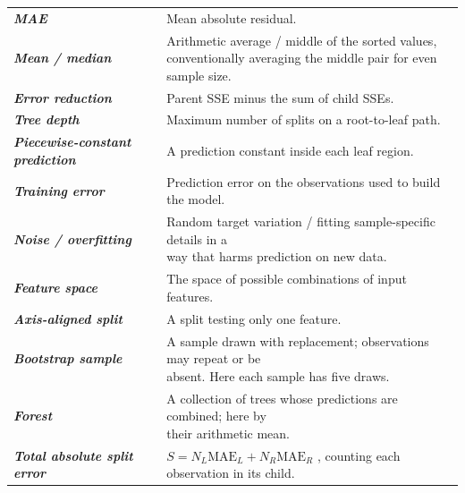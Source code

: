 \documentclass{course_sheet}
\begin{document}
\begin{longtable}{l|l}
\textbf{\textit{MAE}} & Mean absolute residual. \\[1.5pt]
\textbf{\textit{Mean / median}} & \shortstack[l]{Arithmetic average / middle of the sorted values, \\ conventionally averaging the middle pair for even sample size.} \\[1.5pt]
\textbf{\textit{Error reduction}} & Parent SSE minus the sum of child SSEs. \\[1.5pt]
\textbf{\textit{Tree depth}} & Maximum number of splits on a root-to-leaf path. \\[1.5pt]
\textbf{\textit{Piecewise-constant prediction}} & A prediction constant inside each leaf region. \\[1.5pt]
\textbf{\textit{Training error}} & Prediction error on the observations used to build the model. \\[1.5pt]
\textbf{\textit{Noise / overfitting}} & \shortstack[l]{Random target variation / fitting sample-specific details in a \\ way that harms prediction on new data.} \\[1.5pt]
\textbf{\textit{Feature space}} & The space of possible combinations of input features. \\[1.5pt]
\textbf{\textit{Axis-aligned split}} & A split testing only one feature. \\[1.5pt]
\textbf{\textit{Bootstrap sample}} & \shortstack[l]{A sample drawn with replacement; observations may repeat or be \\ absent. Here each sample has five draws.} \\[1.5pt]
\textbf{\textit{Forest}} & \shortstack[l]{A collection of trees whose predictions are combined; here by \\ their arithmetic mean.} \\[1.5pt]
\textbf{\textit{Total absolute split error}} & \shortstack[l]{$S=N_L\mathrm{MAE}_L+N_R\mathrm{MAE}_R$ , counting each \\ observation in its child.} \\[1.5pt]
\end{longtable}
\endgroup
\end{document}

